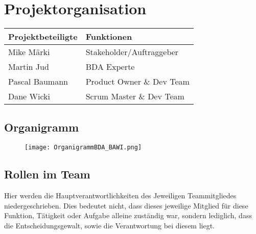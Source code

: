 \section{Projektorganisation}

\vspace{1em}

\begin{tabularx}{\textwidth}{|X|X|}
	\hline
	\textbf{Projektbeteiligte} & \textbf{Funktionen} \\
	\hline
	Mike Märki & Stakeholder/Auftraggeber \\
	\hline
	Martin Jud & BDA Experte \\
	\hline
	Pascal Baumann & Product Owner \& Dev Team \\
	\hline
	Dane Wicki & Scrum Master \& Dev Team \\
	\hline
\end{tabularx}

\subsection{Organigramm}
\begin{figure}[h!]
	\centering
	\texttt{[image: OrganigrammBDA\_BAWI.png]}
\end{figure}

\subsection{Rollen im Team}
Hier werden die Hauptverantwortlichkeiten des Jeweiligen Teammitgliedes niedergeschrieben. Dies bedeutet nicht, dass dieses jeweilige Mitglied für diese Funktion, Tätigkeit oder Aufgabe alleine zuständig war, sondern lediglich, dass die Entscheidungsgewalt, sowie die Verantwortung bei diesem liegt.

